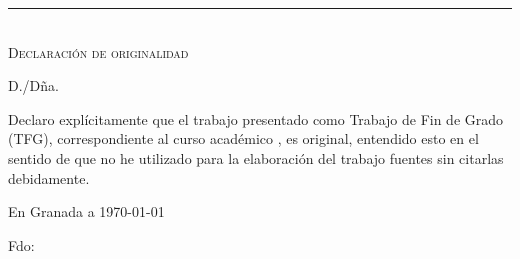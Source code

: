 \thispagestyle{empty}
{}

\hfill
\vfill
\noindent\rule[-1ex]{\textwidth}{2pt}\\[4.5ex]
\textsc{Declaración de originalidad}\\\bigskip

D./Dña. \miNombre \\\medskip

Declaro explícitamente que el trabajo presentado como Trabajo de Fin de Grado (TFG), correspondiente al curso académico \miCurso, es original, entendido esto en el sentido de que no he utilizado para la elaboración del trabajo fuentes sin citarlas debidamente.
\medskip

En Granada a \today 
\vspace{3cm}
\begin{center} 
Fdo: \miNombre 

\end{center}

\vfill

\cleardoublepage
\endinput